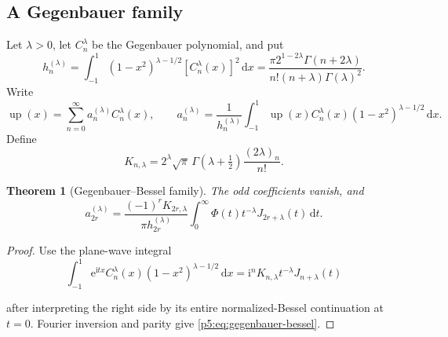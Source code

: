 \documentclass[11pt,oneside]{article}
\newtheorem{theorem}{Theorem}[section]
\theoremstyle{definition}
\newcommand{\dd}{\,\mathrm d}
\newcommand{\e}{\mathrm e}
\newcommand{\ii}{\mathrm i}
\newcommand{\Up}{\operatorname{up}}
\begin{document}
\subsection{A Gegenbauer family}

Let $\lambda>0$, let $C_n^\lambda$ be the Gegenbauer polynomial, and put
\begin{equation}
 h_n^{(\lambda)}=
 \int_{-1}^{1}(1-x^2)^{\lambda-1/2}
 [C_n^\lambda(x)]^2\dd x
 =\frac{\pi2^{1-2\lambda}\Gamma(n+2\lambda)}
 {n!(n+\lambda)\Gamma(\lambda)^2}.                       \label{p5:eq:gegenbauer-norm}
\end{equation}
Write
\begin{equation}
 \Up(x)=\sum_{n=0}^\infty a_n^{(\lambda)}C_n^\lambda(x),
 \qquad
 a_n^{(\lambda)}=\frac1{h_n^{(\lambda)}}
 \int_{-1}^{1}\Up(x)C_n^\lambda(x)
 (1-x^2)^{\lambda-1/2}\dd x.                            \label{p5:eq:gegenbauer-series}
\end{equation}
Define
\begin{equation}
 K_{n,\lambda}=2^\lambda\sqrt\pi\,
 \Gamma(\lambda+\tfrac12)\frac{(2\lambda)_n}{n!}.      \label{p5:eq:gegenbauer-K}
\end{equation}

\begin{theorem}[Gegenbauer--Bessel family]
\label{p5:thm:gegenbauer-bessel}
The odd coefficients vanish, and
\begin{equation}
 \boxed{\displaystyle
 a_{2r}^{(\lambda)}=
 \frac{(-1)^rK_{2r,\lambda}}{\pi h_{2r}^{(\lambda)}}
 \int_0^\infty
 \Phi(t)t^{-\lambda}J_{2r+\lambda}(t)\dd t.}            \label{p5:eq:gegenbauer-bessel}
\end{equation}
\end{theorem}

\begin{proof}
Use the plane-wave integral
\[
 \int_{-1}^{1}\e^{\ii tx}C_n^\lambda(x)
 (1-x^2)^{\lambda-1/2}\dd x
 =\ii^nK_{n,\lambda}t^{-\lambda}J_{n+\lambda}(t)
\]

after interpreting the right side by its entire normalized-Bessel
continuation at $t=0$.  Fourier inversion and parity give
\eqref{p5:eq:gegenbauer-bessel}.
\end{proof}
\end{document}
